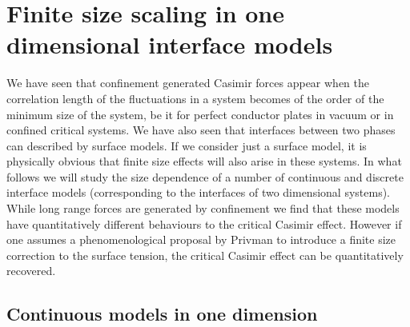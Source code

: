 \section{Finite size scaling in one dimensional interface models}

We have seen that confinement generated Casimir forces appear when the correlation length of the fluctuations in a system becomes of the order of the minimum size of the system,  be it for perfect conductor plates in vacuum or in confined critical systems. We have also seen that interfaces between two phases can described by surface models. If we consider just a surface model, it is physically obvious that finite size effects will also arise in these systems. In what follows we will study the size dependence of a number of continuous and discrete interface models (corresponding to the interfaces of two dimensional systems). While long range forces are generated by confinement we find that these models have quantitatively different behaviours to the critical Casimir effect. However if one assumes a phenomenological proposal by Privman \cite{privman_finite-size_1988-1} to introduce a finite size correction to the surface tension, the critical Casimir effect can be quantitatively recovered.

\subsection{Continuous models in one dimension}

